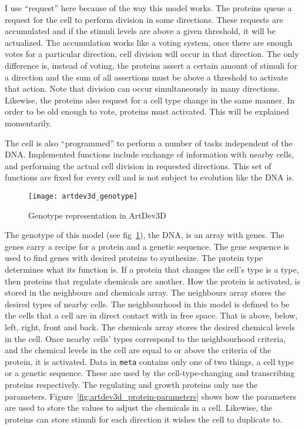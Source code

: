 I use ``request'' here because of the way this model works. The proteins queue a request for the cell to perform division in some directions. These requests are accumulated and if the stimuli levels are above a given threshold, it will be actualized. The accumulation works like a voting system, once there are enough votes for a particular direction, cell division will occur in that direction. The only difference is, instead of voting, the proteins assert a certain amount of stimuli for a direction and the sum of all assertions must be above a threshold to activate that action. Note that division can occur simultaneously in many directions. Likewise, the proteins also request for a cell type change in the same manner. In order to be old enough to vote, proteins must activated. This will be explained momentarily.

The cell is also ``programmed'' to perform a number of tasks independent of the DNA. Implemented functions include exchange of information with nearby cells, and performing the actual cell division in requested directions. This set of functions are fixed for every cell and is not subject to evolution like the DNA is.

\begin{figure}[!ht]
	\centering
	\texttt{[image: artdev3d\_genotype]}
	\caption{Genotype representation in ArtDev3D}
	\label{fig:artdev3d_genotype}
\end{figure}

The genotype of this model (see fig~\ref{fig:artdev3d_genotype}), the DNA, is an array with genes. The genes carry a recipe for a protein and a genetic sequence. The gene sequence is used to find genes with desired proteins to synthesize. The protein type determines what its function is. If a protein that changes the cell's type is a type, then proteins that regulate chemicals are another. How the protein is activated, is stored in the neighbours and chemicals array. The neighbours array stores the desired types of nearby cells. The neighbourhood in this model is defined to be the cells that a cell are in direct contact with in free space. That is above, below, left, right, front and back. The chemicals array stores the desired chemical levels in the cell. Once nearby cells' types correspond to the neighbourhood criteria, and the chemical levels in the cell are equal to or above the criteria of the protein, it is activated. Data in \texttt{meta} contains only one of two things, a cell type or a genetic sequence. These are used by the cell-type-changing and transcribing proteins respectively. The regulating and growth proteins only use the parameters. Figure~\ref{fig:artdev3d_protein-parameters} shows how the parameters are used to store the values to adjust the chemicals in a cell. Likewise, the proteins can store stimuli for each direction it wishes the cell to duplicate to.

